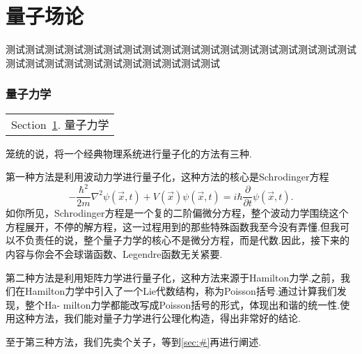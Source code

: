 \part{量子场论}\label{Part:QFT}
	测试测试测试测试测试测试测试测试测试测试测试测试测试测试测试测试测试测试测试测试测试测试测试测试测试测试测试测试测试
	\section{量子力学}\label{sec:QM}
		\begin{margintable}\vspace{1.4in}\footnotesize
			\begin{tabularx}{\marginparwidth}{|X}
			Section~\ref{sec:QM}. 量子力学\\
			\end{tabularx}
		\end{margintable}
		笼统的说，将一个经典物理系统进行量子化的方法有三种.
		
		第一种方法是利用波动力学进行量子化，这种方法的核心是Schrodinger方程
		\begin{equation}
			-\frac{\hbar^2}{2m}\nabla^2\psi(\overrightarrow{x},t)+V(\overrightarrow{x})\psi(\overrightarrow{x},t)=i\hbar\frac{\partial}{\partial t}\psi(\overrightarrow{x},t).
		\end{equation}
		如你所见，Schrodinger方程是一个复的二阶偏微分方程，整个波动力学围绕这个方程展开，不停的解方程，这一过程用到的那些特殊函数我至今没有弄懂.但我可以不负责任的说，整个量子力学的核心不是微分方程，而是代数.因此，接下来的内容与你会不会球谐函数、Legendre函数无关紧要.

		第二种方法是利用矩阵力学进行量子化，这种方法来源于Hamilton力学.之前，我们在Hamilton力学中引入了一个Lie代数结构，称为Poisson括号.通过计算我们发现，整个Ha-
		milton力学都能改写成Poisson括号的形式，体现出和谐的统一性.使用这种方法，我们能对量子力学进行公理化构造，得出非常好的结论.

		至于第三种方法，我们先卖个关子，等到\ref{sec:#}再进行阐述.

